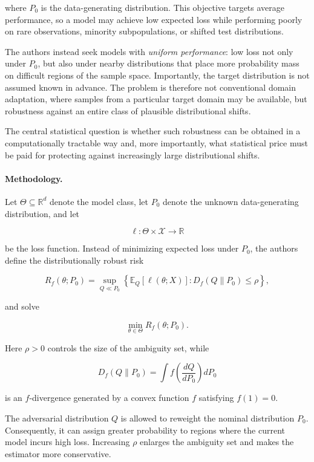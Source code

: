\documentclass[11pt]{article}
\begin{document}
where \(P_0\) is the data-generating distribution. This objective targets average performance, so a model may achieve low expected loss while performing poorly on rare observations, minority subpopulations, or shifted test distributions.

The authors instead seek models with \emph{uniform performance}: low loss not only under \(P_0\), but also under nearby distributions that place more probability mass on difficult regions of the sample space. Importantly, the target distribution is not assumed known in advance. The problem is therefore not conventional domain adaptation, where samples from a particular target domain may be available, but robustness against an entire class of plausible distributional shifts.

The central statistical question is whether such robustness can be obtained in a computationally tractable way and, more importantly, what statistical price must be paid for protecting against increasingly large distributional shifts.

\paragraph{Methodology.}

Let \(\Theta \subseteq \mathbb{R}^d\) denote the model class, let \(P_0\) denote the unknown data-generating distribution, and let

\[
\ell:\Theta\times\mathcal{X}\rightarrow\mathbb{R}
\]

be the loss function. Instead of minimizing expected loss under \(P_0\), the authors define the distributionally robust risk

\[
R_f(\theta;P_0)
=
\sup_{Q \ll P_0}
\left\{
\mathbb{E}_{Q}
\left[
\ell(\theta;X)
\right]
:
D_f(Q\|P_0)\leq \rho
\right\},
\]

and solve

\[
\min_{\theta\in\Theta}
R_f(\theta;P_0).
\]

Here \(\rho>0\) controls the size of the ambiguity set, while

\[
D_f(Q\|P_0)
=
\int
f\left(
\frac{dQ}{dP_0}
\right)
dP_0
\]

is an \(f\)-divergence generated by a convex function \(f\) satisfying \(f(1)=0\).

The adversarial distribution \(Q\) is allowed to reweight the nominal distribution \(P_0\). Consequently, it can assign greater probability to regions where the current model incurs high loss. Increasing \(\rho\) enlarges the ambiguity set and makes the estimator more conservative.
\end{document}
